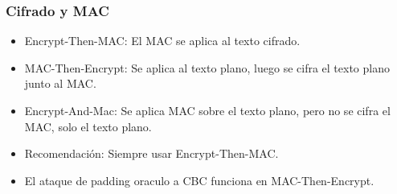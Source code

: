 \documentclass[11pt]{article}
\begin{document}
\subsubsection{Cifrado y MAC}
\label{sec:org7b18a76}
\begin{itemize}
\item Encrypt-Then-MAC: El MAC se aplica al texto cifrado.
\item MAC-Then-Encrypt: Se aplica al texto plano, luego se cifra el texto plano junto al MAC.
\item Encrypt-And-Mac: Se aplica MAC sobre el texto plano, pero no se cifra el MAC, solo el texto plano.

\item Recomendación: Siempre usar Encrypt-Then-MAC.
\item El ataque de padding oraculo a CBC funciona en MAC-Then-Encrypt.
\end{itemize}
\end{document}
